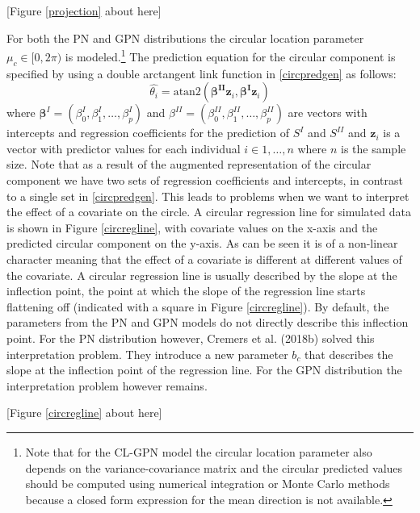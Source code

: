 \documentclass[man,mask]{apa6}
\let\rmarkdownfootnote\footnote%
\def\footnote{\protect\rmarkdownfootnote}
\begin{document}
\hfil [Figure \ref{projection} about here] \hfil

\indent For both the PN and GPN distributions the circular location parameter
\(\mu_c\in [0, 2\pi)\) is modeled.\footnote{Note that for the CL-GPN
model the circular location parameter also depends on the variance-covariance
matrix and the circular predicted values should be computed using numerical
integration or Monte Carlo methods because a closed form expression for the mean
direction is not available.} The prediction equation for the circular component is specified by using a double arctangent link function in \eqref{circpredgen} as follows:
\begin{equation}\label{circpredCLPNCLGPN}
\hat{\theta_i} = \text{atan2}(\boldsymbol{\beta^{II}}\boldsymbol{z}_i, \boldsymbol{\beta^{I}}\boldsymbol{z}_i)
\end{equation}
\noindent where \(\boldsymbol{\beta}^{I} = (\beta_0^{I}, \beta_1^{I}, \dots, \beta_p^{I})\) and
\(\beta^{II} = (\beta_0^{II}, \beta_1^{II}, \dots, \beta_p^{II})\) are vectors with
intercepts and regression coefficients for the prediction of \(S^{I}\) and
\(S^{II}\) and \(\boldsymbol{z}_i\) is a vector with predictor values for each
individual \(i \in 1, \dots, n\) where \(n\) is the sample size. Note that as a
result of the augmented representation of the circular component we have two sets
of regression coefficients and intercepts, in contrast to a single set in
\eqref{circpredgen}. This leads to problems when we want to interpret the effect
of a covariate on the circle. A circular regression line for simulated data is shown in Figure
\ref{circregline}, with covariate values on the x-axis and the predicted
circular component on the y-axis. As can be seen it is of a non-linear character
meaning that the effect of a covariate is different at different values of the
covariate. A circular regression line is usually described by the slope at the
inflection point, the point at which the slope of the regression line starts
flattening off (indicated with a square in Figure \ref{circregline}). By
default, the parameters from the PN and GPN models do not directly describe this
inflection point. For the PN distribution however, Cremers et al. (2018b)
solved this interpretation problem. They introduce a new parameter \(b_c\) that describes the slope at
the inflection point of the regression line. For the GPN distribution the
interpretation problem however remains.

\hfil [Figure \ref{circregline} about here] \hfil
\end{document}
